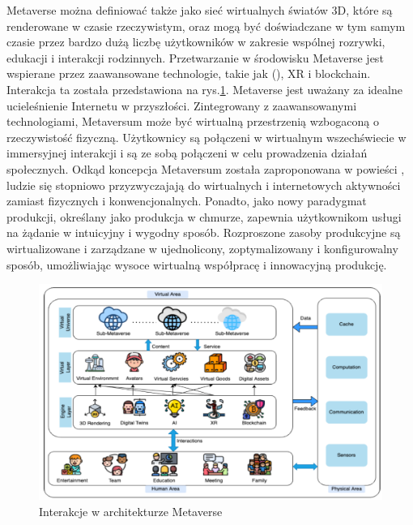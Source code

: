 Metaverse można definiować także jako sieć wirtualnych światów 3D, które są renderowane w czasie rzeczywistym, oraz mogą być doświadczane w tym samym czasie przez bardzo dużą liczbę użytkowników w zakresie wspólnej rozrywki, edukacji i interakcji rodzinnych. Przetwarzanie w środowisku Metaverse jest wspierane przez zaawansowane technologie, takie jak  (), XR i blockchain. Interakcja ta została przedstawiona na rys.\ref{abstractMetaverseArchitectureHumanVirtualPhisical}. Metaverse jest uważany za idealne ucieleśnienie Internetu w przyszłości. Zintegrowany z zaawansowanymi technologiami, Metaversum może być wirtualną przestrzenią wzbogaconą o rzeczywistość fizyczną. Użytkownicy są połączeni w wirtualnym wszechświecie w immersyjnej interakcji i są ze sobą połączeni w celu prowadzenia działań społecznych. Odkąd koncepcja Metaversum została zaproponowana w powieści , ludzie się stopniowo przyzwyczajają do wirtualnych i internetowych aktywności zamiast fizycznych i konwencjonalnych. Ponadto, jako nowy paradygmat produkcji, określany jako produkcja w chmurze, zapewnia użytkownikom usługi na żądanie w intuicyjny i wygodny sposób. Rozproszone zasoby produkcyjne są wirtualizowane i zarządzane w ujednolicony, zoptymalizowany i konfigurowalny sposób, umożliwiając wysoce wirtualną współpracę i innowacyjną produkcję\cite{industrialMetaverseForSmartManufacturing}. 

\begin{figure}[htbp!]
    \centering
    \includegraphics[width=\textwidth]{images/metaverse/metaverseAbstractArchitecture.png}
    \caption{Interakcje w architekturze Metaverse\cite{aSurveyofMobileEdgeComputingForMetaverse}}
    \label{abstractMetaverseArchitectureHumanVirtualPhisical}
\end{figure}

